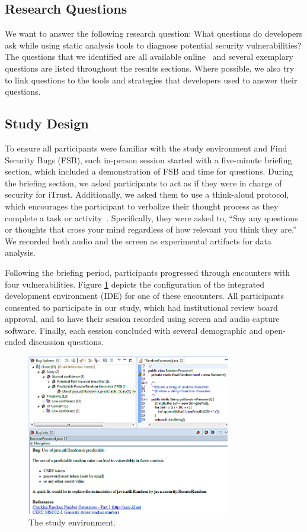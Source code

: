 \documentclass{acm_proc_article-sp}
\begin{document}
\subsection{Research Questions}
\label{rqs}
We want to answer the following research question: What questions do developers ask while using static analysis tools to diagnose potential security vulnerabilities? 
The questions that we identified are all available online~\cite{ExperimentalMaterials} and several exemplary questions are listed throughout the results sections.
Where possible, we also try to link questions to the tools and strategies that developers used to answer their questions.




\subsection{Study Design}
\label{studyDesign}
To ensure all participants were familiar with the study environment and Find Security Bugs (FSB),
each in-person session started with a five-minute briefing section, which included a demonstration of FSB and time for questions.
During the briefing section, we asked participants to act as if they were in charge of security for iTrust.
Additionally, we asked them to use a think-aloud protocol, which encourages the participant to verbalize their thought process as they complete a task or activity~\cite{nielsen2002getting}. 
Specifically, they were asked to, ``Say any questions or thoughts that cross your mind regardless of how relevant you think they are.''
We recorded both audio and the screen as experimental artifacts for data analysis.

Following the briefing period, participants progressed through encounters with four vulnerabilities. 
Figure \ref{fig:environment} depicts the configuration of the integrated development environment (IDE) for one of these encounters.
All participants consented to participate in our study, which had institutional review board approval, and to have their session recorded using screen and audio capture software.
Finally, each session concluded with several demographic and open-ended discussion questions.

\begin{figure}
	\centering
	\includegraphics[width=3.5in]{Images/environment.png}
	\caption{The study environment.}
	\label{fig:environment} 
\end{figure}
\end{document}
